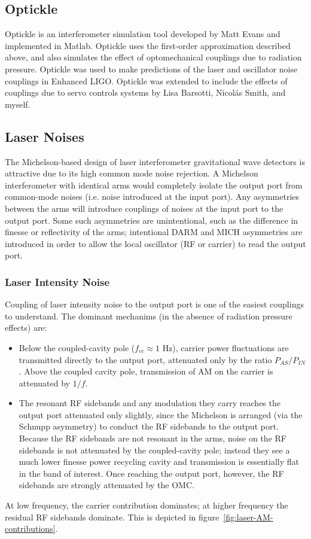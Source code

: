 \subsection*{Optickle}
Optickle\cite{Evans2007Optickle} is an interferometer simulation tool
developed by Matt Evans and implemented in Matlab.  Optickle uses the
first-order approximation described above, and also simulates the
effect of optomechanical couplings due to radiation pressure.
Optickle was used to make predictions of the laser and oscillator
noise couplings in Enhanced LIGO.  Optickle was extended to include
the effects of couplings due to servo controls systems by Lisa
Barsotti, Nicol\'as Smith, and myself.

\subsection{Laser Noises}

The Michelson-based design of laser interferometer gravitational wave detectors
is attractive due to its high common mode noise rejection.  A Michelson
interferometer with identical arms would completely isolate the output port from
common-mode noises (i.e. noise introduced at the input port).  Any asymmetries
between the arms will introduce couplings of noises at the input port to the
output port.  Some such asymmetries are unintentional, such as the difference in
finesse or reflectivity of the arms; intentional DARM and MICH asymmetries are
introduced in order to allow the local oscillator (RF or carrier) to read the
output port.

\subsubsection{Laser Intensity Noise}

Coupling of laser intensity noise to the output port is one of the easiest
couplings to understand.  The dominant mechanims (in the absence of radiation
pressure effects) are:
%
\begin{itemize}
\item Below the coupled-cavity pole ($f_{cc}\approx 1$ Hz), carrier power
  fluctuations are transmitted directly to the output port, attenuated only by
  the ratio $P_{AS}/P_{IN}$.  Above the coupled cavity pole, transmission of AM
  on the carrier is attenuated by $1/f$.
\item The resonant RF sidebands and any modulation they carry reaches the output
  port attenuated only slightly, since the Michelson is arranged (via the
  Schnupp asymmetry) to conduct the RF sidebands to the output port.  Because
  the RF sidebands are not resonant in the arms, noise on the RF sidebands is
  not attenuated by the coupled-cavity pole; instead they see a much lower
  finesse power recycling cavity and transmission is essentially flat in the
  band of interest.  Once reaching the output port, however, the RF sidebands
  are strongly attenuated by the OMC.
\end{itemize}
At low frequency, the carrier contribution dominates; at higher
frequency the residual RF sidebands dominate.  This is depicted in
figure~\ref{fig:laser-AM-contributions}.

